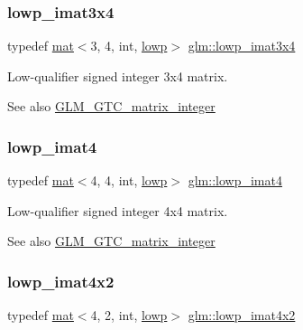 \subsubsection{\texorpdfstring{lowp\+\_\+imat3x4}{lowp\_imat3x4}}
{\footnotesize\ttfamily typedef \hyperlink{structglm_1_1mat}{mat}$<$3, 4, int, \hyperlink{namespaceglm_a36ed105b07c7746804d7fdc7cc90ff25ae161af3fc695e696ce3bf69f7332bc2d}{lowp}$>$ \hyperlink{group__gtc__matrix__integer_gacbdf7f35076058e4e9be49955ab3fbd3}{glm\+::lowp\+\_\+imat3x4}}

Low-\/qualifier signed integer 3x4 matrix. \begin{DoxySeeAlso}{See also}
\hyperlink{group__gtc__matrix__integer}{G\+L\+M\+\_\+\+G\+T\+C\+\_\+matrix\+\_\+integer} 
\end{DoxySeeAlso}
\mbox{\label{group__gtc__matrix__integer_gaf6a884d14be360b41dc26d59cd732be7}} 
\subsubsection{\texorpdfstring{lowp\+\_\+imat4}{lowp\_imat4}}
{\footnotesize\ttfamily typedef \hyperlink{structglm_1_1mat}{mat}$<$4, 4, int, \hyperlink{namespaceglm_a36ed105b07c7746804d7fdc7cc90ff25ae161af3fc695e696ce3bf69f7332bc2d}{lowp}$>$ \hyperlink{group__gtc__matrix__integer_gaf6a884d14be360b41dc26d59cd732be7}{glm\+::lowp\+\_\+imat4}}

Low-\/qualifier signed integer 4x4 matrix. \begin{DoxySeeAlso}{See also}
\hyperlink{group__gtc__matrix__integer}{G\+L\+M\+\_\+\+G\+T\+C\+\_\+matrix\+\_\+integer} 
\end{DoxySeeAlso}
\mbox{\label{group__gtc__matrix__integer_gad0e232eab19300176c21b9bc1bd7d247}} 
\subsubsection{\texorpdfstring{lowp\+\_\+imat4x2}{lowp\_imat4x2}}
{\footnotesize\ttfamily typedef \hyperlink{structglm_1_1mat}{mat}$<$4, 2, int, \hyperlink{namespaceglm_a36ed105b07c7746804d7fdc7cc90ff25ae161af3fc695e696ce3bf69f7332bc2d}{lowp}$>$ \hyperlink{group__gtc__matrix__integer_gad0e232eab19300176c21b9bc1bd7d247}{glm\+::lowp\+\_\+imat4x2}}

